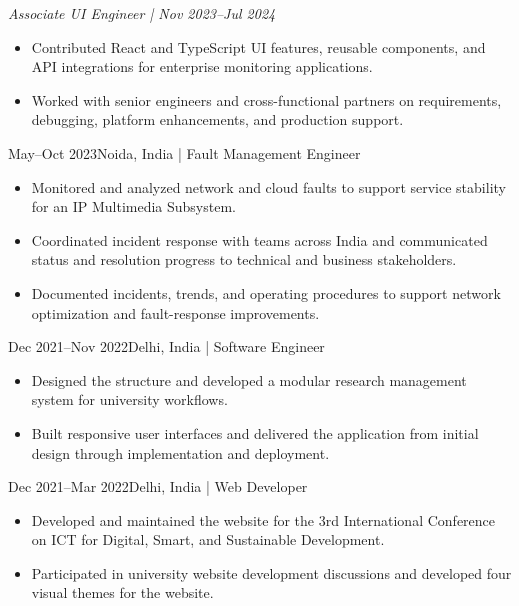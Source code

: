 \textit{Associate UI Engineer | Nov 2023--Jul 2024}
\begin{itemize}
  \item Contributed React and TypeScript UI features, reusable components, and
  API integrations for enterprise monitoring applications.
  \item Worked with senior engineers and cross-functional partners on
  requirements, debugging, platform enhancements, and production support.
\end{itemize}

{May--Oct 2023}{Noida, India | Fault Management Engineer}
\begin{itemize}
  \item Monitored and analyzed network and cloud faults to support service
  stability for an IP Multimedia Subsystem.
  \item Coordinated incident response with teams across India and communicated
  status and resolution progress to technical and business stakeholders.
  \item Documented incidents, trends, and operating procedures to support
  network optimization and fault-response improvements.
\end{itemize}

{Dec 2021--Nov 2022}{Delhi, India | Software Engineer}
\begin{itemize}
  \item Designed the structure and developed a modular research management
  system for university workflows.
  \item Built responsive user interfaces and delivered the application from
  initial design through implementation and deployment.
\end{itemize}

{Dec 2021--Mar 2022}{Delhi, India | Web Developer}
\begin{itemize}
  \item Developed and maintained the website for the 3rd International
  Conference on ICT for Digital, Smart, and Sustainable Development.
\end{itemize}

\begin{itemize}
  \item Participated in university website development discussions and
  developed four visual themes for the website.
\end{itemize}
